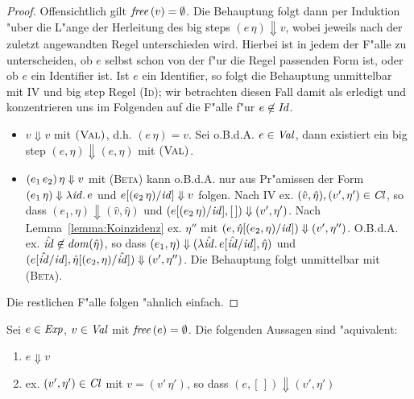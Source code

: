 \documentclass[12pt,fleqn]{article}
\newcommand{\RN}[1]{\mbox{\textsc{(#1)}}}
\newcommand{\Cl}{\name{Cl}}
\begin{document}
\begin{proof}
  Offensichtlich gilt ${\text{\it free\/}}\,(v) = \emptyset$. Die Behauptung folgt
  dann per Induktion "uber die L"ange der Herleitung des big steps $(e\,\eta) \Downarrow v$, wobei jeweils nach der
  zuletzt angewandten Regel unterschieden wird. Hierbei ist in jedem der F"alle zu unterscheiden, ob $e$ selbst
  schon von der f"ur die Regel passenden Form ist, oder ob $e$ ein Identifier ist. Ist $e$ ein Identifier, so
  folgt die Behauptung unmittelbar mit IV und big step Regel \RN{Id}; wir betrachten diesen Fall damit als erledigt
  und konzentrieren uns im Folgenden auf die F"alle f"ur $e\not\in{\text{\it Id\/}}$.
  \begin{itemize}
    \item $v \Downarrow v$ mit $\RN{Val}$, d.h. $(e\,\eta) = v$. Sei o.B.d.A. $e \in {\text{\it Val\/}}$, dann existiert ein
          big step $(e,\eta) \Downarrow (e,\eta)$ mit $\RN{Val}$.
          

    \item $(e_1\,e_2)\,\eta \Downarrow v$ mit \RN{Beta} kann o.B.d.A. nur aus Pr"amissen der Form
          $(e_1\,\eta) \Downarrow \lambda {\text{\it id\/}}.\,e$ und $e[(e_2\,\eta)/{\text{\it id\/}}]\Downarrow v$ folgen. Nach IV ex.
          $(\hat{v},\hat{\eta}),(v',\eta')\in\Cl$, so dass $(e_1,\eta) \Downarrow (\hat{v},\hat{\eta})$
          und $(e[(e_2\,\eta)/{\text{\it id\/}}],[\,])\Downarrow (v',\eta')$. Nach Lemma~\ref{lemma:Koinzidenz} ex. $\eta''$
          mit $(e,\hat{\eta}[(e_2,\eta)/{\text{\it id\/}}]) \Downarrow (v',\eta'')$. O.B.d.A. ex. $\hat{{\text{\it id\/}}}\not\in{\text{\it dom\/}}(\hat{\eta})$,
          so dass $(e_1,\eta) \Downarrow (\lambda \hat{{\text{\it id\/}}}.\,e[\hat{{\text{\it id\/}}}/{\text{\it id\/}}],\hat{\eta})$ und
          $(e[\hat{{\text{\it id\/}}}/{\text{\it id\/}}],\hat{\eta}[(e_2,\eta)/\hat{{\text{\it id\/}}}]) \Downarrow (v',\eta'')$. Die Behauptung folgt
          unmittelbar mit \RN{Beta}.
  \end{itemize}
  Die restlichen F"alle folgen "ahnlich einfach.
\end{proof}

\begin{theorem}["Aquivalenzsatz]
  Sei $e \in {\text{\it Exp\/}}$, $v \in {\text{\it Val\/}}$ mit ${\text{\it free\/}}\,(e) = \emptyset$. Die folgenden Aussagen sind "aquivalent:
  \begin{enumerate}
    \item $e \Downarrow v$
    \item ex. $(v',\eta')\in\Cl$ mit $v = (v'\,\eta')$, so dass $(e,[\,]) \Downarrow (v',\eta')$
  \end{enumerate}
\end{theorem}
\end{document}
